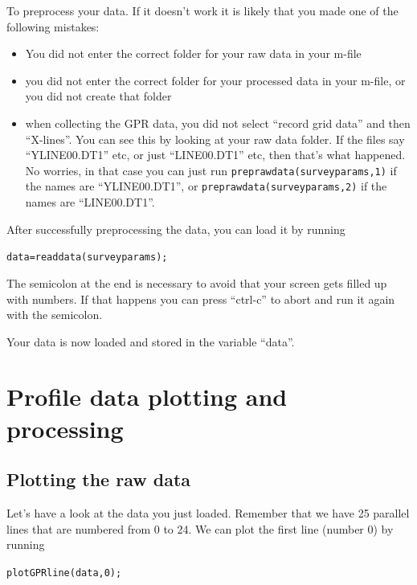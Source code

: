 \documentclass[11pt]{article}
\begin{document}
To preprocess your data. If it doesn't work it is likely that you made
one of the following mistakes:
\begin{itemize}
\item You did not enter the correct folder for your raw data in your
  m-file
\item you did not enter the correct folder for your processed data in
  your m-file, or you did not create that folder
\item when collecting the GPR data, you did not select ``record grid
  data'' and then ``X-lines''. You can see this by looking at your raw
  data folder. If the files say ``YLINE00.DT1'' etc, or just
  ``LINE00.DT1'' etc, then that's what happened. No worries, in that
  case you can just run \qquad \verb#preprawdata(surveyparams,1)# if
  the names are ``YLINE00.DT1'', or \verb#preprawdata(surveyparams,2)#
  if the names are ``LINE00.DT1''.
\end{itemize}

After successfully preprocessing the data, you can load it by running

\qquad \verb#data=readdata(surveyparams);#

The semicolon at the end is necessary to avoid that your screen gets
filled up with numbers. If that happens you can press ``ctrl-c'' to
abort and run it again with the semicolon.
 
Your data is now loaded and stored in the variable ``data''.

\section{Profile data plotting and processing}\label{secProfiles}

\subsection{Plotting the raw data}

Let's have a look at the data you just loaded. Remember that we have
25 parallel lines that are numbered from 0 to 24. We can plot the
first line (number 0) by running

\qquad \verb#plotGPRline(data,0);#
\end{document}

